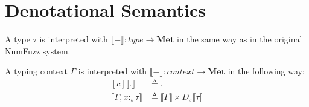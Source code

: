 \section{Denotational Semantics}

\newpage

\begin{definition}
  A type $\tau$ is interpreted with $\llbracket - \rrbracket : \textit{type} \to
  \textbf{Met}$ in the same way as in the original NumFuzz system.
\end{definition}


\begin{definition}
  A typing context $\Gamma$ is interpreted with $\llbracket - \rrbracket :
  \textit{context} \to \textbf{Met}$ in the following way:
  \begin{equation}
  \begin{aligned}[c]
    \llbracket . \rrbracket &\triangleq . \\
    \llbracket \Gamma, x :_s \tau \rrbracket &\triangleq \llbracket \Gamma \rrbracket
      \times D_s \llbracket \tau \rrbracket
  \end{aligned}
  \end{equation}
\end{definition}

\newpage


